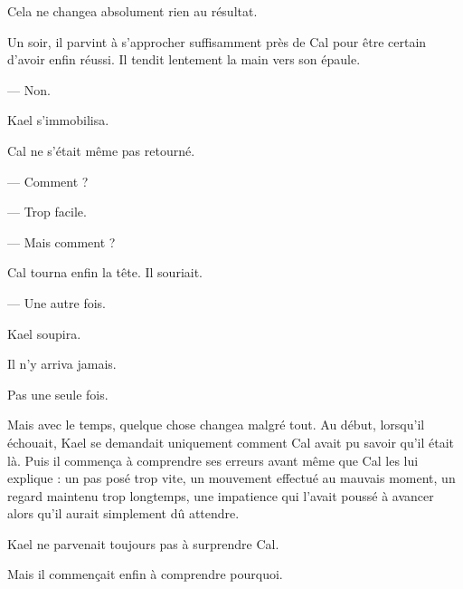 Cela ne changea absolument rien au résultat.

Un soir, il parvint à s'approcher suffisamment près de Cal pour être certain
d'avoir enfin réussi. Il tendit lentement la main vers son épaule.

— Non.

Kael s'immobilisa.

Cal ne s'était même pas retourné.

— Comment ?

— Trop facile.

— Mais comment ?

Cal tourna enfin la tête. Il souriait.

— Une autre fois.

Kael soupira.

Il n'y arriva jamais.

Pas une seule fois.

Mais avec le temps, quelque chose changea malgré tout. Au début, lorsqu'il
échouait, Kael se demandait uniquement comment Cal avait pu savoir qu'il était
là. Puis il commença à comprendre ses erreurs avant même que Cal les lui
explique : un pas posé trop vite, un mouvement effectué au mauvais moment, un
regard maintenu trop longtemps, une impatience qui l'avait poussé à avancer
alors qu'il aurait simplement dû attendre.

Kael ne parvenait toujours pas à surprendre Cal.

Mais il commençait enfin à comprendre pourquoi.